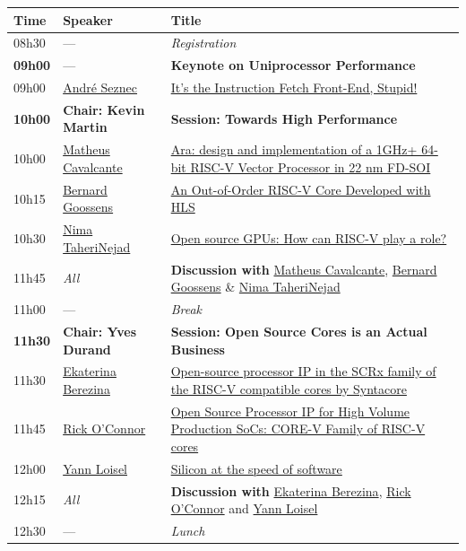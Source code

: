 \documentclass[a4paper, 10pt]{article}
\begin{document}
\begin{center}
\begin{tabular}{l|p{4cm}|p{11cm}}
\hline
Time & Speaker & Title\\
\hline
08h30 & --- & \emph{Registration}\\
\hline
\textbf{09h00} & --- & \textbf{Keynote on Uniprocessor Performance}\\
\hline
09h00 & \hyperref[sec:org9d270ea]{André Seznec} & \hyperref[sec:org9d270ea]{It's the Instruction Fetch Front-End, Stupid!}\\
\hline
\textbf{10h00} & \textbf{Chair: Kevin Martin} & \textbf{Session: Towards High Performance}\\
\hline
10h00 & \hyperref[sec:org555c581]{Matheus Cavalcante} & \hyperref[sec:org555c581]{Ara: design and implementation of a 1GHz+ 64-bit RISC-V Vector Processor in 22 nm FD-SOI}\\
10h15 & \hyperref[sec:org2e5f334]{Bernard Goossens} & \hyperref[sec:org2e5f334]{An Out-of-Order RISC-V Core Developed with HLS}\\
10h30 & \hyperref[sec:org32bc8c5]{Nima TaheriNejad} & \hyperref[sec:org32bc8c5]{Open source GPUs: How can RISC-V play a role?}\\
11h45 & \emph{All} & \textbf{Discussion with} \hyperref[sec:org555c581]{Matheus Cavalcante},  \hyperref[sec:org2e5f334]{Bernard Goossens} \& \hyperref[sec:org32bc8c5]{Nima TaheriNejad}\\
\hline
11h00 & --- & \emph{Break}\\
\hline
\textbf{11h30} & \textbf{Chair: Yves Durand} & \textbf{Session: Open Source Cores is an Actual Business}\\
\hline
11h30 & \hyperref[sec:orga8599a4]{Ekaterina Berezina} & \hyperref[sec:orga8599a4]{Open-source processor IP in the SCRx family of the RISC-V compatible cores by Syntacore}\\
11h45 & \hyperref[sec:org95c1564]{Rick O'Connor} & \hyperref[sec:org95c1564]{Open Source Processor IP for High Volume Production SoCs: CORE-V Family of RISC-V cores}\\
12h00 & \hyperref[sec:org4fde642]{Yann Loisel} & \hyperref[sec:org4fde642]{Silicon at the speed of software}\\
12h15 & \emph{All} & \textbf{Discussion with} \hyperref[sec:orga8599a4]{Ekaterina Berezina}, \hyperref[sec:org95c1564]{Rick O'Connor} and \hyperref[sec:org4fde642]{Yann Loisel}\\
\hline
12h30 & --- & \emph{Lunch}\\

\end{tabular}
\end{center}
\end{document}
